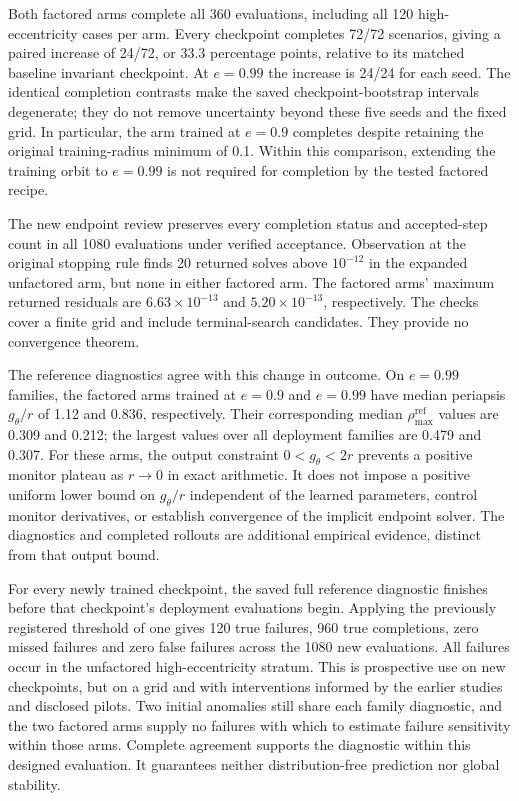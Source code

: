 \documentclass[final,3p,times]{elsarticle}
\begin{document}
Both factored arms complete all 360 evaluations, including all 120
high-eccentricity cases per arm. Every checkpoint completes 72/72
scenarios, giving a paired increase of 24/72, or 33.3 percentage points,
relative to its matched baseline invariant checkpoint. At $e=0.99$ the
increase is 24/24 for each seed. The identical completion contrasts make
the saved checkpoint-bootstrap intervals degenerate; they do not remove
uncertainty beyond these five seeds and the fixed grid. In particular,
the arm trained at $e=0.9$ completes despite retaining the original
training-radius minimum of 0.1. Within this comparison, extending the
training orbit to $e=0.99$ is not required for completion by the tested
factored recipe.

The new endpoint review preserves every completion status and accepted-step
count in all 1080 evaluations under verified acceptance. Observation at the
original stopping rule finds 20 returned solves above $10^{-12}$ in the
expanded unfactored arm, but none in either factored arm. The factored
arms' maximum returned residuals are $6.63\times10^{-13}$ and
$5.20\times10^{-13}$, respectively. The checks cover a finite grid and include
terminal-search candidates. They provide no convergence theorem.

The reference diagnostics agree with this change in outcome. On
$e=0.99$ families, the factored arms trained at $e=0.9$ and $e=0.99$
have median periapsis $g_\theta/r$ of 1.12 and 0.836, respectively.
Their corresponding median $\rho_{\max}^{\mathrm{ref}}$ values are
0.309 and 0.212; the largest values over all deployment families are
0.479 and 0.307. For these arms, the output constraint
$0<g_\theta<2r$ prevents a positive monitor plateau as $r\to0$ in
exact arithmetic. It does not impose a positive uniform lower bound
on $g_\theta/r$ independent of the learned parameters, control monitor
derivatives, or establish convergence
of the implicit endpoint solver. The diagnostics and completed rollouts
are additional empirical evidence, distinct from that output bound.

For every newly trained checkpoint, the saved full reference diagnostic
finishes before that checkpoint's deployment evaluations begin. Applying
the previously registered threshold of one gives 120 true failures,
960 true completions, zero missed failures and zero false failures across
the 1080 new evaluations. All failures occur in the unfactored
high-eccentricity stratum. This is prospective use on new checkpoints,
but on a grid and with interventions informed by the earlier studies
and disclosed pilots. Two initial anomalies still share each family
diagnostic, and the two factored arms supply no failures with which to
estimate failure sensitivity within those arms. Complete agreement supports the diagnostic within
this designed evaluation. It guarantees neither distribution-free
prediction nor global stability.
\end{document}

